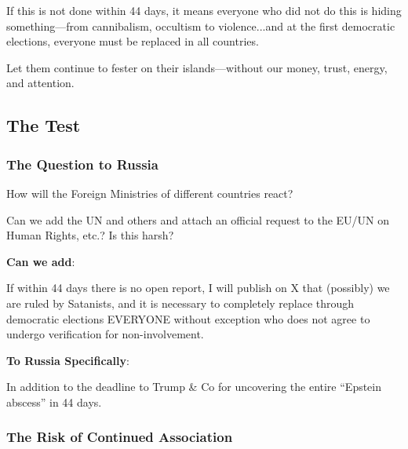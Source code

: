 \documentclass[11pt,a4paper]{article}
\theoremstyle{definition}
\theoremstyle{remark}
\begin{document}
If this is not done within 44 days, it means everyone who did not do this is hiding something—from cannibalism, occultism to violence...and at the first democratic elections, everyone must be replaced in all countries.

Let them continue to fester on their islands—without our money, trust, energy, and attention.

\subsection{The Test}

\begin{center}
\end{center}

\subsubsection{The Question to Russia}

How will the Foreign Ministries of different countries react?

Can we add the UN and others and attach an official request to the EU/UN on Human Rights, etc.? Is this harsh?

\textbf{Can we add}:

If within 44 days there is no open report, I will publish on X that (possibly) we are ruled by Satanists, and it is necessary to completely replace through democratic elections EVERYONE without exception who does not agree to undergo verification for non-involvement.

\textbf{To Russia Specifically}:

In addition to the deadline to Trump \& Co for uncovering the entire ``Epstein abscess'' in 44 days.

\begin{center}
\end{center}

\subsubsection{The Risk of Continued Association}
\end{document}
